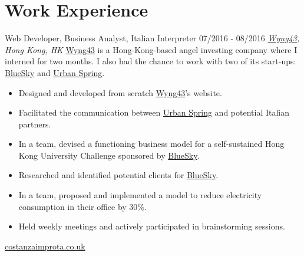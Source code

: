 \documentclass[]{friggeri-cv}
\begin{document}
\section{\color{red}Work \color{gray} Experience}
\begin{entrylist}
  \entry
    {}
    {Web Developer, Business Analyst, Italian Interpreter}
    {07/2016 - 08/2016}
    {\emph{\href{http://www.wyng43.com/}{Wyng43}, Hong Kong, HK}}
    {\href{http://www.wyng43.com/}{Wyng43} is a Hong-Kong-based angel investing company where I interned for two months. I also had the chance to work with two of its start-ups: \href{http://www.hibluesky.co/}{BlueSky} and \href{http://www.urbanspring.hk/}{Urban Spring}.}
    \begin{itemize}
        \item Designed and developed from scratch \href{http://www.wyng43.com/}{Wyng43}'s website.
        \item Facilitated the communication between \href{http://www.urbanspring.hk/}{Urban Spring} and potential Italian partners.
        \item In a team, devised a functioning business model for a self-sustained Hong Kong University Challenge sponsored by \href{http://www.hibluesky.co/}{BlueSky}.
        \item Researched and identified potential clients for \href{http://www.hibluesky.co/}{BlueSky}. 
        \item In a team, proposed and implemented a model to reduce electricity consumption in their office by 30\%.
        \item Held weekly meetings and actively participated in brainstorming sessions.
    \end{itemize}
\end{entrylist}

\clearpage
\newpage

       {\href{http://www.costanzaimprota.co.uk/}{costanzaimprota.co.uk}}
       
\end{document}
